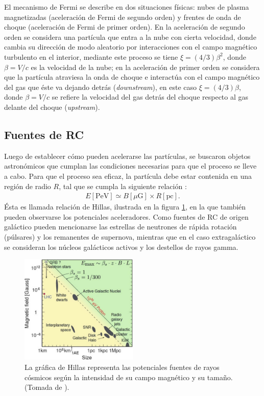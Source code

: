 	El mecanismo de Fermi se describe en dos situaciones físicas: nubes de plasma magnetizadas (aceleración de Fermi de segundo orden) y frentes de onda de choque (aceleración de Fermi de primer orden). En la aceleración de segundo orden se considera una partícula que entra a la nube con cierta velocidad, donde cambia su dirección de modo aleatorio por interacciones con el campo magnético turbulento en el interior, mediante este proceso se tiene $\xi=(4/3) \beta^2$, donde $\beta= V/c$ es la velocidad de la nube; en la aceleración de primer orden se considera que la partícula atraviesa la onda de choque e interactúa con el campo magnético del gas que éste va dejando detrás (\textit{downstream}), en este caso $\xi=(4/3) \beta$, donde $\beta= V/c$ se refiere la velocidad del gas detrás del choque respecto al gas delante del choque (\textit{upstream}).
	
	\subsection{Fuentes de RC}
	Luego de establecer cómo pueden acelerarse las partículas, se buscaron objetos astronómicos que cumplan las condiciones necesarias para que el proceso se lleve a cabo. Para que el proceso sea eficaz, la partícula debe estar contenida en una región de radio $R$, tal que se cumpla la siguiente relación \cite{DeAngelis2015}:	
	\begin{align}
	E[\text{PeV}] \simeq B[\mu\text{G}]\times R[\text{pc}].
	\end{align}
	Ésta es llamada relación de Hillas, ilustrada en la figura \ref{fig:Hillas}, en la que también pueden observarse los potenciales aceleradores. Como fuentes de RC de origen galáctico pueden mencionarse las estrellas de neutrones de rápida rotación (púlsares) y los remanentes de supernova, mientras que en el caso extragaláctico se consideran los núcleos galácticos activos y los destellos de rayos gamma.
	
	\begin{figure}[h]
	\centering	
	\includegraphics[width=0.5\textwidth]{Figuras/Hillas_Relation} 
	\caption{La gráfica de Hillas representa las potenciales fuentes de rayos cósmicos según la intensidad de su campo magnético y su tamaño. (Tomada de \cite{DeAngelis2015}).}
	\label{fig:Hillas}
	\end{figure}	

